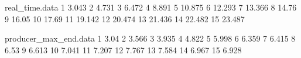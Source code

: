 \begin{filecontents}{real_time.data}
1 3.043
2 4.731
3 6.472
4 8.891
5 10.875
6 12.293
7 13.366
8 14.76
9 16.05
10 17.69
11 19.142
12 20.474
13 21.436
14 22.482
15 23.487
\end{filecontents}

\begin{filecontents}{producer_max_end.data}
1 3.04
2 3.566
3 3.935
4 4.822
5 5.998
6 6.359
7 6.415
8 6.53
9 6.613
10 7.041
11 7.207
12 7.767
13 7.584
14 6.967
15 6.928
\end{filecontents}